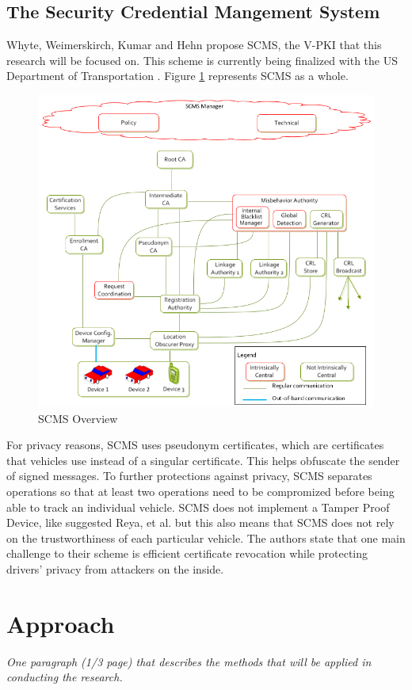 \documentclass {article}
\newcommand{\sechint}[1]{\small{\emph{#1}} \bigskip}
\begin{document}
\subsection{The Security Credential Mangement System}
Whyte, Weimerskirch, Kumar and Hehn propose SCMS, the V-PKI that this research will be focused on. This scheme is currently being finalized with the US Department of Transportation \autocite{SecCredMgr}. Figure \ref{scms_overview} represents SCMS as a whole. 
\begin{figure}[!ht]
	\centering
	\includegraphics[width=.8\textwidth]{images/scms_overview.png}
	\caption{SCMS Overview}
	\label{scms_overview}
\end{figure}
For privacy reasons, SCMS uses pseudonym certificates, which are certificates that vehicles use instead of a singular certificate. This helps obfuscate the sender of signed messages. To further protections against privacy, SCMS separates operations so that at least two operations need to be compromized before being able to track an individual vehicle. SCMS does not implement a Tamper Proof Device, like suggested Reya, et al. but this also means that SCMS does not rely on the trustworthiness of each particular vehicle. The authors state that one main challenge to their scheme is efficient certificate revocation while protecting drivers' privacy from attackers on the inside.

\section{Approach}{\sechint{One paragraph (1/3 page) that describes the methods that will be applied in conducting the research.}}
\end{document}
